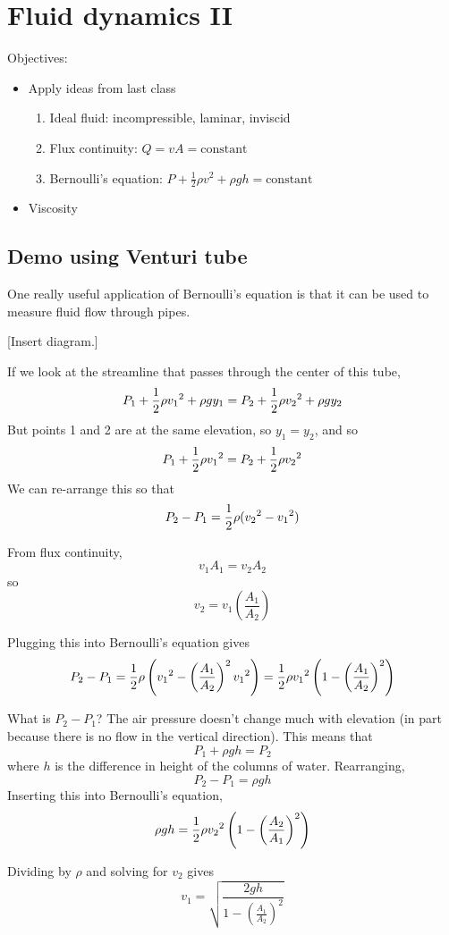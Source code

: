 \section{Fluid dynamics II}
Objectives:
\begin{itemize}
  \item Apply ideas from last class
    \begin{enumerate}
    \item Ideal fluid: incompressible, laminar, inviscid
    \item Flux continuity: $Q=vA=\mbox{constant}$
    \item Bernoulli's equation: $P+\frac{1}{2}\rho v^2+\rho gh=\mbox{constant}$
    \end{enumerate}
  \item Viscosity
\end{itemize}


\subsection{Demo using Venturi tube}
One really useful application of Bernoulli's equation is that it can be used to measure fluid flow through pipes.

[Insert diagram.]
\vspace{5cm}

If we look at the streamline that passes through the center of this tube,
$$P_1+\frac{1}{2}\rho v_1\displaystyle^2+\rho gy_1=P_2+\frac{1}{2}\rho v_2\displaystyle^2+\rho gy_2$$
But points 1 and 2 are at the same elevation, so $y_1=y_2$, and so
$$P_1+\frac{1}{2}\rho v_1\displaystyle^2=P_2+\frac{1}{2}\rho v_2\displaystyle^2$$
We can re-arrange this so that
$$P_2-P_1=\frac{1}{2}\rho(v_2\displaystyle^2-v_1\displaystyle^2)$$

From flux continuity, 
$$v_1A_1=v_2A_2$$
so 
$$v_2=v_1\left(\frac{A_1}{A_2}\right)$$

Plugging this into Bernoulli's equation gives
$$P_2-P_1=\frac{1}{2}\rho\left(v_1\displaystyle^2-\left(\frac{A_1}{A_2}\right)^2v_1\displaystyle^2\right)=\frac{1}{2}\rho v_1\displaystyle^2\left(1-\left(\frac{A_1}{A_2}\right)^2\right)$$

What is $P_2-P_1$? The air pressure doesn't change much with elevation (in part because there is no flow in the vertical direction). This means that
$$P_1+\rho gh=P_2$$
where $h$ is the difference in height of the columns of water. Rearranging,
$$P_2-P_1=\rho gh$$
Inserting this into Bernoulli's equation,
$$\rho gh=\frac{1}{2}\rho v_2\displaystyle^2\left(1-\left(\frac{A_2}{A_1}\right)^2\right)$$

Dividing by $\rho$ and solving for $v_2$ gives
$$\boxed{v_1=\sqrt{\frac{2gh}{1-\left(\frac{A_1}{A_2}\right)^2}}}$$

